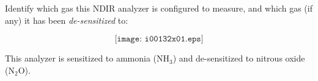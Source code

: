 

Identify which gas this NDIR analyzer is configured to measure, and which gas (if any) it has been {\it de-sensitized} to:

$$\texttt{[image: i00132x01.eps]}$$







This analyzer is sensitized to ammonia (NH$_{3}$) and de-sensitized to nitrous oxide (N$_{2}$O).










